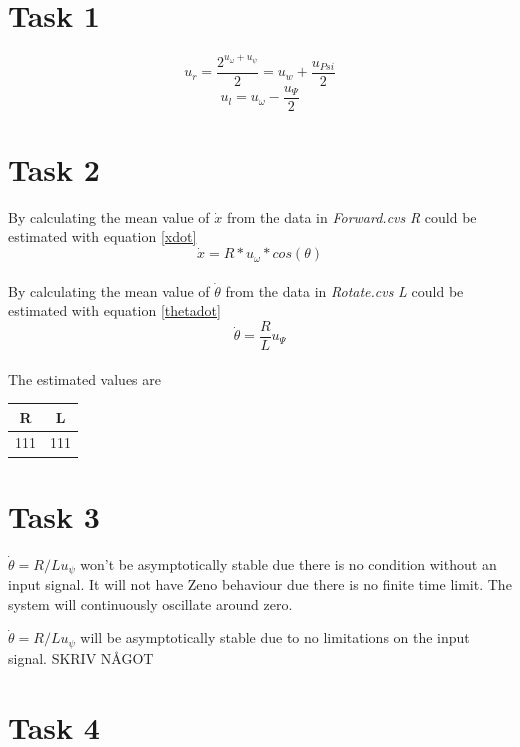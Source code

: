\documentclass[a4paper,12pt,oneside,onecolumn]{article} %
\begin{document}
\section*{Task 1}

\begin{equation}
u_r = \frac{2^{u_{\omega} + u_{\psi}}}{2} = u_w + \frac{u_{Psi}}{2}
\end{equation}
\begin{equation}
u_l = u_\omega - \frac{u_\Psi}{2}
\end{equation}

\section*{Task 2}

By calculating the mean value of $\dot{x}$ from the data in \emph{Forward.cvs} \emph{R} could be estimated with equation \eqref{xdot}
\begin{equation}
\dot{x} = R*u_\omega*cos(\theta) \label{xdot}
\end{equation}
\\
By calculating the mean value of $\dot{\theta}$ from the data in \emph{Rotate.cvs} \emph{L} could be estimated with equation \eqref{thetadot}
\begin{equation}
\dot{\theta} = \frac{R}{L}u_\Psi\label{thetadot}
\end{equation}
\\
The estimated values are
\begin{center}
	\begin{tabular}{| c | c |}
	\hline
	R & L \\ \hline
	111 & 111 \\ \hline
	
	\end{tabular}
\end{center}

\section*{Task 3}

$\dot{\theta} = R/L u_\psi$ won't be asymptotically stable due there is no condition without an input signal. It will not have Zeno behaviour due there is no finite time limit. The system will continuously oscillate around zero.

$\dot{\theta} = R/L u_\psi$ will be asymptotically stable due to no limitations on the input signal. SKRIV NÅGOT

\section*{Task 4}
\end{document}
